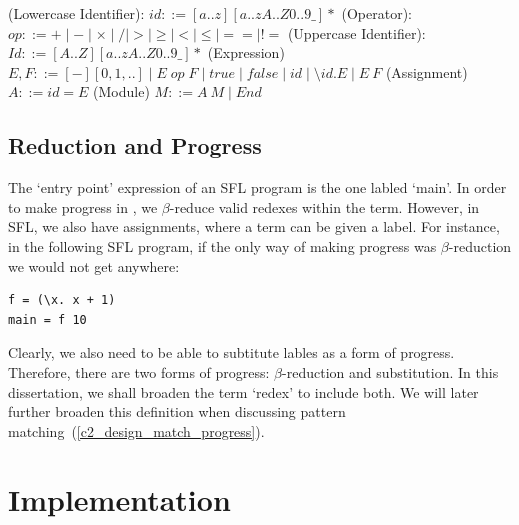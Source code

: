\begin{syntax}
(Lowercase Identifier): \(id ::= [a..z][a..zA..Z0..9\_]*\)\newline
(Operator): \(op ::= + \mid - \mid \times \mid / \mid > \mid \ge \mid < \mid \le \mid== \mid \mathrel{\mathtt{!=}} \)\newline
(Uppercase Identifier): \(Id ::= [A..Z][a..zA..Z0..9\_]*\)
\newline\newline\noindent
(Expression) \(E, F ::= [-][0, 1, ..]\mid E\; op\; F \mid true \mid false \mid id \mid \setminus id. E \mid E\:F\)\newline
(Assignment) \(A ::= id = E\)\newline
(Module) \(M ::= A\: M \mid End\)
\label{sfl_basic_syntax}
\end{syntax}

\subsection{Reduction and Progress} 
\label{c1:reduction_and_progress}
The `entry point' expression of an \ac{SFL} program is the one labled `main'. In order to make progress in \lcalc, we $\beta$-reduce valid redexes within the term. However, in \ac{SFL}, we also have assignments, where a term can be given a label. For instance, in the following \ac{SFL} program, if the only way of making progress was $\beta$-reduction we would not get anywhere:

\begin{lstlisting}[language=SFL]
f = (\x. x + 1)
main = f 10
\end{lstlisting}

\noindent Clearly, we also need to be able to subtitute lables as a form of progress. Therefore, there are two forms of progress: $\beta$-reduction and substitution. In this dissertation, we shall broaden the term `redex' to include both. We will later further broaden this definition when discussing pattern matching~(\ref{c2_design_match_progress}). 

\section{Implementation}
